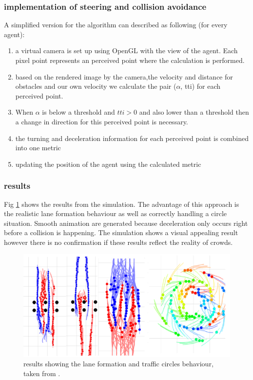 \documentclass[sigconf]{acmart}
\begin{document}
\subsubsection{implementation of steering and collision avoidance} A simplified version for the algorithm can described as following (for every agent):
\begin{enumerate}
    \item a virtual camera is set up using OpenGL with the view of the agent. Each pixel point represents an perceived point where the calculation is performed. 
    \item based on the rendered image by the camera,the velocity and distance for obstacles and our own velocity we calculate the pair (\.{$\alpha$}, tti) for each perceived point.
    \item When \.{$\alpha$} is below a threshold and $tti > 0$ and also lower than a threshold then a change in direction for this perceived point is necessary. 
    \item the turning and deceleration information for each perceived point is combined into one metric 
    \item updating the position of the agent using the calculated metric
\end{enumerate}

\subsubsection{results}

Fig \ref{fig:visualResults} shows the results from the simulation. The advantage of this approach is the realistic lane formation behaviour as well as correctly handling a circle situation. Smooth animation are generated because deceleration only occurs right before a collision is happening. The simulation shows a visual appealing result however there is no confirmation if these results reflect the reality of crowds.

\begin{figure}[h]
  \centering
  \includegraphics[width=1\linewidth]{images/visualApproach-results.png}
  \caption{results showing the lane formation  and traffic circles behaviour, taken from \cite{ondrej_synthetic-vision_2010}.}
  \label{fig:visualResults}
\end{figure}
\end{document}
